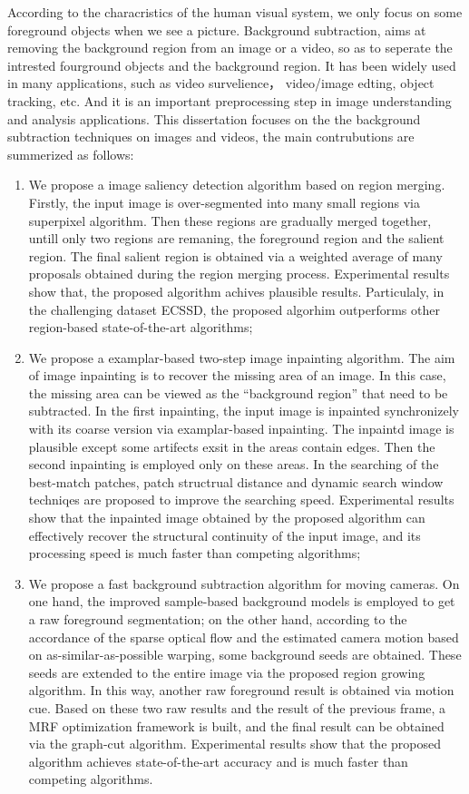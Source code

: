 \begin{eabstract}
   According to the characristics of the human visual system, we only focus on some foreground objects when we see a picture. Background subtraction, aims at removing the background region from an image or a video, so as to seperate the intrested fourground objects and the background region. It has been widely used in many applications, such as video survelience， video/image edting, object tracking, etc. And it is an important preprocessing step in image  understanding and analysis applications. This dissertation focuses on the the background subtraction techniques on images and videos, the main contrubutions are summerized as follows:
   \begin{enumerate}
   \item We propose a image saliency detection algorithm based on region merging. Firstly, the input image is over-segmented into many small regions via superpixel algorithm. Then these regions are gradually merged together, untill only two regions are remaning, the foreground region and the salient region. The final salient region is obtained via a weighted average of many proposals obtained during the region merging process. Experimental results show that, the proposed algorithm achives plausible results. Particulaly, in the challenging dataset ECSSD, the proposed algorhim outperforms other region-based state-of-the-art algorithms;
   \item We propose a examplar-based two-step image inpainting algorithm. The aim of image inpainting is to recover the missing area of an image. In this case, the missing area can be viewed as the ``background region''  that need to be subtracted. In the first inpainting, the input image is inpainted synchronizely with its coarse version via examplar-based inpainting. The inpaintd image is plausible except some artifects exsit in the areas contain edges. Then the second inpainting is employed only on these areas. In the searching of the best-match patches, patch structrual distance and dynamic search window techniqes are proposed to improve the searching speed. Experimental results show that the inpainted image obtained by the proposed algorithm can effectively recover the structural continuity of the input image, and its processing speed is much faster than competing algorithms;
   \item We propose a fast background subtraction algorithm for moving cameras. On one hand, the improved sample-based background models is employed to get a raw foreground segmentation; on the other hand, according to the accordance of the sparse optical flow and the estimated camera motion based on as-similar-as-possible warping, some background seeds are obtained. These seeds are extended to the entire image via the proposed region growing algorithm. In this way, another raw foreground result is obtained via motion cue. Based on these two raw results and the result of the previous frame, a MRF optimization framework is built, and the final result can be obtained via the graph-cut algorithm. Experimental results show that the proposed algorithm achieves state-of-the-art accuracy and is much faster than competing algorithms.
   

\end{enumerate}
\end{eabstract}
